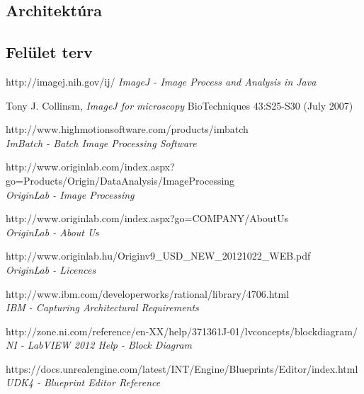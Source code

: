 \documentclass[a4paper,12pt,oneside]{report}
\begin{document}
\subsection{Architektúra}

\subsection{Felület terv}

%
%

\begin{thebibliography}{99}
        http://imagej.nih.gov/ij/
        {\em ImageJ - Image Process and Analysis in Java}
        
		Tony J. Collinsm,
        {\em ImageJ for microscopy}
        BioTechniques 43:S25-S30 (July 2007)

        http://www.highmotionsoftware.com/products/imbatch\\
        {\em ImBatch - Batch Image Processing Software}

		http://www.originlab.com/index.aspx?go=Products/Origin/DataAnalysis/ImageProcessing\\
        {\em OriginLab - Image Processing}
        
        
        http://www.originlab.com/index.aspx?go=COMPANY/AboutUs\\
        {\em OriginLab - About Us}

		http://www.originlab.hu/Originv9\_USD\_NEW\_20121022\_WEB.pdf\\
        {\em OriginLab - Licences}
        
        http://www.ibm.com/developerworks/rational/library/4706.html\\
        {\em IBM - Capturing Architectural Requirements}  


		http://zone.ni.com/reference/en-XX/help/371361J-01/lvconcepts/blockdiagram/\\
        {\em NI - LabVIEW 2012 Help - Block Diagram}  

		https://docs.unrealengine.com/latest/INT/Engine/Blueprints/Editor/index.html\\
        {\em UDK4 - Blueprint Editor Reference}  



\end{thebibliography}
\end{document}
